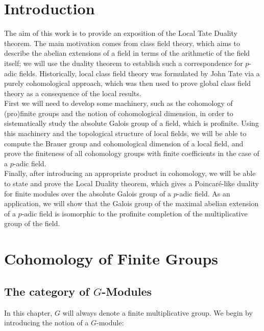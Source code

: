 \documentclass[a4paper, oneside]{memoir}
\begin{document}
\tableofcontents

\chapter*{Introduction}
The aim of this work is to provide an exposition of the Local Tate Duality theorem. The main motivation comes from class field theory, which aims to describe the abelian
extensions of a field in terms of the arithmetic of the field itself; we will use the duality theorem to establish such a correspondence for $p$-adic fields. Historically, local class field theory was formulated by John Tate via a purely cohomological approach,
which was then used to prove global class field theory as a consequence of the local results.\\

First we will need to develop some machinery, such as the cohomology of (pro)finite groups and the notion of cohomological dimension, in order to sistematically study the absolute Galois group of
a field, which is profinite. Using this machinery and the topological structure of local fields, we will be able to compute the Brauer group and cohomological dimension of a local field, and prove the
finiteness of all cohomology groups with finite coefficients in the case of a $p$-adic field.\\

Finally, after introducing an appropriate product in cohomology, we will be able to state and prove the Local Duality theorem, which gives a Poincaré-like duality for finite modules over the
absolute Galois group of a $p$-adic field. As an application, we will show that the Galois group of the maximal abelian extension of a $p$-adic field is isomorphic to the profinite
completion of the multiplicative group of the field.


\chapter{Cohomology of Finite Groups}

\section{\texorpdfstring{The category of $G$-Modules}{The category of G-Modules}}

In this chapter, $G$ will always denote a finite multiplicative group. We begin by introducing the notion of a $G$-module:
\end{document}
